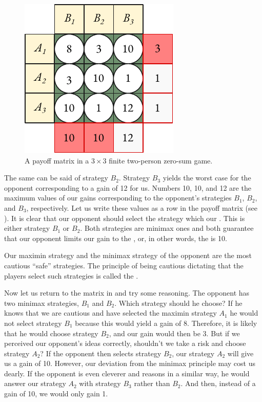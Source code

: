  \begin{figure}
 \centering
 \includegraphics[width=0.9\linewidth]{figures/two-player3.pdf}
\caption{A payoff matrix in a $3 \times 3$ finite two-person zero-sum game.\label{twoplayer3}}
 \end{figure}
The same can be said of strategy $B_{2}$. Strategy $B_{3}$ yields the worst case
for the opponent corresponding to a gain of 12 for us. Numbers 10, 10,
and 12 are the maximum values of our gains corresponding to the
opponent's strategies $B_{1}$, $B_{2}$, and $B_{3}$, respectively. Let us write these values as a row in the payoff matrix (see ). It is clear that our opponent should select the strategy which  our . This is either strategy $B_{1}$ or $B_{2}$. Both strategies are minimax ones and both guarantee that our opponent limits our gain to the , or, in other words, the  is 10.

Our maximin strategy and the minimax strategy of the opponent are
the most cautious ``safe'' strategies. The principle of being cautious
dictating that the players select such strategies is called the .

Now let us return to the matrix in  and try some reasoning. The opponent has two minimax strategies,  $B_{1}$ and  $B_{2}$. Which strategy should he choose? If he knows that we are cautious and have selected the maximin strategy  $A_{1}$ he would not select strategy  $B_{1}$ because this would yield a gain of 8. Therefore, it is likely that he would choose
strategy $B_{2}$, and our gain would then be 3. But if we perceived our
opponent's ideas correctly, shouldn't we take a risk and choose strategy
 $A_{2}$? If the opponent then selects strategy  $B_{2}$, our strategy  $A_{2}$ will give us a gain of 10. However, our deviation from the minimax principle may
cost us dearly. If the opponent is even cleverer and reasons in a similar
way, he would answer our strategy  $A_{2}$ with strategy  $B_{3}$ rather than  $B_{2}$. And then, instead of a gain of 10, we would only gain 1.

